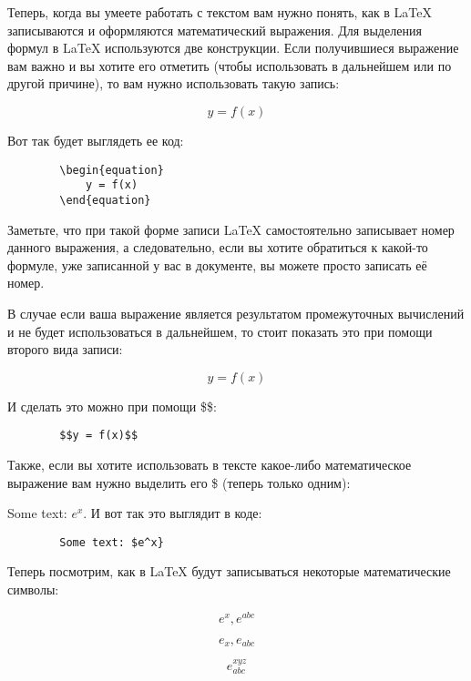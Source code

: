     Теперь, когда вы умеете работать с текстом вам нужно понять, как в \LaTeX{} записываются и оформляются математический выражения. Для выделения формул в \LaTeX{} используются две конструкции. Если получившиеся выражение вам важно и вы хотите его отметить (чтобы использовать в дальнейшем или по другой причине), то вам нужно использовать такую запись:
    
    \begin{equation}
        y = f(x)
    \end{equation}
    
    Вот так будет выглядеть ее код:    
    
    \begin{verbatim}
        \begin{equation}
            y = f(x)
        \end{equation}
    \end{verbatim}   
    
    Заметьте, что при такой форме записи \LaTeX{} самостоятельно записывает номер данного выражения, а следовательно, если вы хотите обратиться к какой-то формуле, уже записанной у вас в документе, вы можете просто записать её номер.
    
    В случае если ваша выражение является результатом промежуточных вычислений и не будет использоваться в дальнейшем, то стоит показать это при помощи второго вида записи:
    
    $$y = f(x)$$    
    
    И сделать это можно при помощи \$\$:    
    
    \begin{verbatim}
        $$y = f(x)$$
    \end{verbatim}
    
    Также, если вы хотите использовать в тексте какое-либо математическое выражение вам нужно выделить его \$ (теперь только одним):

    Some text: $e^x$. И вот так это выглядит в коде:
    
    \begin{verbatim}
        Some text: $e^x}
    \end{verbatim}
    
    Теперь посмотрим, как в \LaTeX{} будут записываться некоторые математические символы:
    
    $$e^x, e^{abc}$$
        
    $$e_x, e_{abc}$$
    
    $$e^{xyz}_{abc}$$
    

